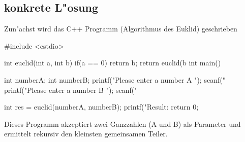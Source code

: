\documentclass[a4paper,11pt,titlepage]{article}
\begin{document}
    \subsection{konkrete L"osung}
    Zun"achst wird das C++ Programm (Algorithmus des Euklid) geschrieben \\
    \begin{listing}
        #include <cstdio>

        int euclid(int a, int b){
            if(a == 0){
                return b;
            }
            return euclid(b %
        }
        int main(){
            int numberA;
            int numberB;
            printf("Please enter a number A \n");
            scanf("%
            printf("Please enter a number B \n");
            scanf("%

            int res = euclid(numberA, numberB);
            printf("Result: %
            return 0;
        }
    \end{listing}

    Dieses Programm akzeptiert zwei Ganzzahlen (A und B) als Parameter und ermittelt rekursiv den kleinsten gemeinsamen Teiler.
\end{document}
